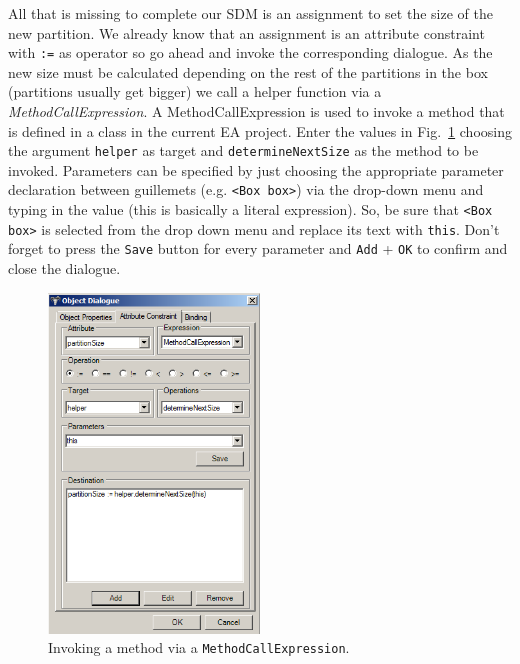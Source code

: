 All that is missing to complete our SDM is an assignment to set the size of the
new partition.  We already know that an assignment is an attribute
constraint with \texttt{:=} as operator so go ahead and invoke the corresponding
dialogue.  As the new size must be calculated depending on the rest of the
partitions in the box (partitions usually get bigger) we call a helper function
via a \emph{MethodCallExpression}.  A MethodCallExpression is used to invoke a
method that is defined in a class in the current EA project.  Enter the values
in Fig.~\ref{fig:sdm_grow_4} choosing the argument \texttt{helper} as target and
\texttt{determineNextSize} as the method to be invoked.  Parameters can be
specified by just choosing the appropriate parameter declaration between
guillemets (e.g. \texttt{<Box box>}) via the drop-down menu and typing in the
value (this is basically a literal expression). So, be sure that \texttt{<Box box>} is selected
from the drop down menu and replace its text with \texttt{this}. Don't forget to
press the \texttt{Save} button for every parameter and \texttt{Add} 
+ \texttt{OK} to confirm and close the dialogue.
 
\begin{figure}[htbp]
\begin{center}
  \includegraphics[width=0.5\textwidth]{pics/sdmBilder/grow/sdm66}
  \caption{Invoking a method via a \texttt{MethodCallExpression}.}  
  \label{fig:sdm_grow_4} 
\end{center}
\end{figure}

